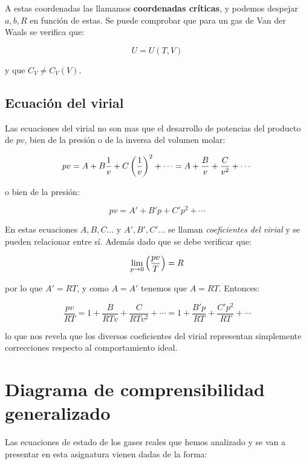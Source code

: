 \documentclass[12pt]{book}
\begin{document}
A estas coordenadas las llamamos \textbf{coordenadas críticas}, y podemos despejar $a,b,R$ en función de estas. Se puede comprobar que para un gas de Van der Waals se verifica que:

\begin{equation}
U = U(T,V)
\end{equation}

y que $C_V \neq C_V(V)$.

\subsection{Ecuación del virial}

Las ecuaciones del virial no son mas que el desarrollo de potencias del producto de $pv$, bien de la presión o de la inversa del volumen molar:

\begin{equation}
pv = A + B \dfrac{1}{v} + C \left( \dfrac{1}{v} \right)^2 + \cdots = A + \dfrac{B}{v} + \dfrac{C}{v^2} + \cdots 
\end{equation}

o bien de la presión:

\begin{equation}
pv = A' + B' p + C' p^2 + \cdots
\end{equation}

En estas ecuaciones $A,B,C...$ y $A',B',C'...$ se llaman \textit{coeficientes del virial} y se pueden relacionar entre sí. Además dado que se debe verificar que:

\begin{equation}
\lim_{p \rightarrow 0} \left( \dfrac{pv}{T} \right) = R
\end{equation}

por lo que $A' = RT$, y como $A=A'$ tenemos que $A=RT$. Entonces:

\begin{equation}
\dfrac{pv}{RT}  = 1 + \dfrac{B}{RT v} + \dfrac{C}{RT v^2} + \cdots = 1 + \dfrac{B' p}{RT} + \dfrac{C' p^2}{RT} + \cdots
\end{equation}

lo que nos revela que los diversos coeficientes del virial representan simplemente correcciones respecto al comportamiento ideal.


\section{Diagrama de comprensibilidad generalizado}

Las ecuaciones de estado de los gases reales que hemos analizado y se van a presentar en esta asignatura vienen dadas de la forma:
\end{document}
